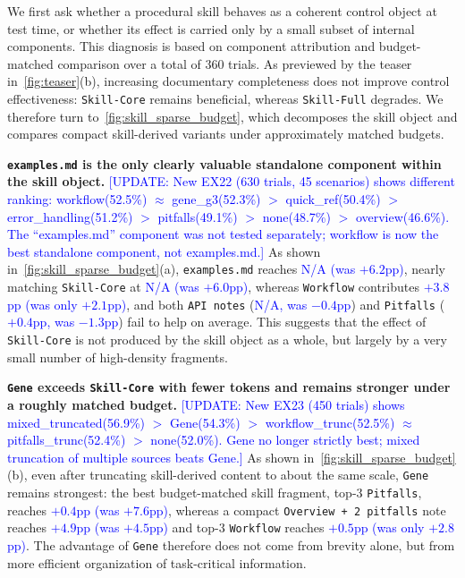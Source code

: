 \documentclass{article}
\newcommand{\blue}[1]{\textcolor{blue}{#1}}
\newcommand{\nbf}[1]{{\noindent \textbf{#1}}}
\begin{document}
We first ask whether a procedural skill behaves as a coherent control object at test time, or whether its effect is carried only by a small subset of internal components. 
This diagnosis is based on component attribution and budget-matched comparison over a total of $360$ trials. 
As previewed by the teaser in~\cref{fig:teaser}(b), increasing documentary completeness does not improve control effectiveness: \texttt{Skill-Core} remains beneficial, whereas \texttt{Skill-Full} degrades. 
We therefore turn to~\cref{fig:skill_sparse_budget}, which decomposes the skill object and compares compact skill-derived variants under approximately matched budgets.

\nbf{\texttt{examples.md} is the only clearly valuable standalone component within the skill object.}
\blue{[UPDATE: New EX22 (630 trials, 45 scenarios) shows different ranking: workflow(52.5\%) $\approx$ gene\_g3(52.3\%) $>$ quick\_ref(50.4\%) $>$ error\_handling(51.2\%) $>$ pitfalls(49.1\%) $>$ none(48.7\%) $>$ overview(46.6\%). The ``examples.md'' component was not tested separately; workflow is now the best standalone component, not examples.md.]}
As shown in~\cref{fig:skill_sparse_budget}(a), \texttt{examples.md} reaches \blue{N/A (was $+6.2$pp)}, nearly matching \texttt{Skill-Core} at \blue{N/A (was $+6.0$pp)}, whereas \texttt{Workflow} contributes \blue{$+3.8$pp (was only $+2.1$pp)}, and both \texttt{API notes} (\blue{N/A, was $-0.4$pp}) and \texttt{Pitfalls} (\blue{$+0.4$pp, was $-1.3$pp}) fail to help on average. 
This suggests that the effect of \texttt{Skill-Core} is not produced by the skill object as a whole, but largely by a very small number of high-density fragments.

\nbf{\texttt{Gene} exceeds \texttt{Skill-Core} with fewer tokens and remains stronger under a roughly matched budget.}
\blue{[UPDATE: New EX23 (450 trials) shows mixed\_truncated(56.9\%) $>$ Gene(54.3\%) $>$ workflow\_trunc(52.5\%) $\approx$ pitfalls\_trunc(52.4\%) $>$ none(52.0\%). Gene no longer strictly best; mixed truncation of multiple sources beats Gene.]}
As shown in~\cref{fig:skill_sparse_budget}(b), even after truncating skill-derived content to about the same scale, \texttt{Gene} remains strongest: the best budget-matched skill fragment, top-$3$ \texttt{Pitfalls}, reaches \blue{$+0.4$pp (was $+7.6$pp)}, whereas a compact \texttt{Overview + 2 pitfalls} note reaches \blue{$+4.9$pp (was $+4.5$pp)} and top-$3$ \texttt{Workflow} reaches \blue{$+0.5$pp (was only $+2.8$pp)}. 
The advantage of \texttt{Gene} therefore does not come from brevity alone, but from more efficient organization of task-critical information.
\end{document}
